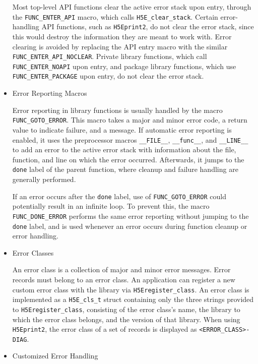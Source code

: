 \begin{itemize}
Most top-level API functions clear the active error stack upon entry, through the \texttt{FUNC\_ENTER\_API} macro, which calls \texttt{H5E\_clear\_stack}. Certain error-handling API functions, such as \texttt{H5Eprint2}, do not clear the error stack, since this would destroy the information they are meant to work with. Error clearing is avoided by replacing the API entry macro with the similar \texttt{FUNC\_ENTER\_API\_NOCLEAR}. Private library functions, which call \texttt{FUNC\_ENTER\_NOAPI} upon entry, and package library functions, which use \texttt{FUNC\_ENTER\_PACKAGE} upon entry, do not clear the error stack.

\item Error Reporting Macros

Error reporting in library functions is usually handled by the macro \texttt{FUNC\_GOTO\_ERROR}. This macro takes a major and minor error code, a return value to indicate failure, and a message. If automatic error reporting is enabled, it uses the preprocessor macros \texttt{\_\_FILE\_\_}, \texttt{\_\_func\_\_}, and \texttt{\_\_LINE\_\_} to add an error to the active error stack with information about the file, function, and line on which the error occurred. Afterwards, it jumps to the \texttt{done} label of the parent function, where cleanup and failure handling are generally performed.

If an error occurs after the \texttt{done} label, use of \texttt{FUNC\_GOTO\_ERROR} could potentially result in an infinite loop. To prevent this, the macro \texttt{FUNC\_DONE\_ERROR} performs the same error reporting without jumping to the \texttt{done} label, and is used whenever an error occurs during function cleanup or error handling.

\item Error Classes

 An error class is a collection of major and minor error messages. Error records must belong to an error class. An application can register a new custom error class with the library via \texttt{H5Eregister\_class}. An error class is implemented as a \texttt{H5E\_cls\_t} struct containing only the three strings provided to \texttt{H5Eregister\_class}, consisting of the error class's name, the library to which the error class belongs, and the version of that library. When using \texttt{H5Eprint2}, the error class of a set of records is displayed as \texttt{<ERROR\_CLASS>-DIAG}. 

\item Customized Error Handling


\end{itemize}
